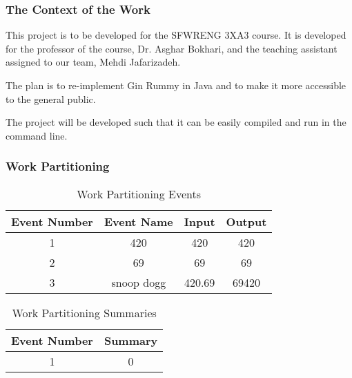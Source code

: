 \documentclass[12pt, titlepage]{article}
\begin{document}
\subsubsection{The Context of the Work}
This project is to be developed for the SFWRENG 3XA3 course. It is developed for the professor of the course, Dr. Asghar Bokhari, and the teaching assistant assigned to our team, Mehdi Jafarizadeh.


The plan is to re-implement Gin Rummy in Java and to make it more accessible to the general public. %

The project will be developed such that it can be easily compiled and run in the command line.
\subsubsection{Work Partitioning}
\begin{table}[H]
\caption{Work Partitioning Events}
    \centering
    \begin{tabular}{|c|c|c|c|}
    \hline
    \textbf{Event Number} & \textbf{Event Name} & \textbf{Input} & \textbf{Output} \\
    \hline
    1 & 420 & 420 & 420 \\
    \hline
    2 & 69 & 69 & 69 \\
    \hline
    3 & snoop dogg & 420.69 & 69420 \\
    \hline
    \end{tabular}
\end{table}

\begin{table}[H]
\caption{Work Partitioning Summaries}
    \centering
    \begin{tabular}{|c|c|}
    \hline
    \textbf{Event Number} & \textbf{Summary} \\
    \hline
    1 & 0 \\
    \hline
    \end{tabular}
\end{table}
\end{document}
